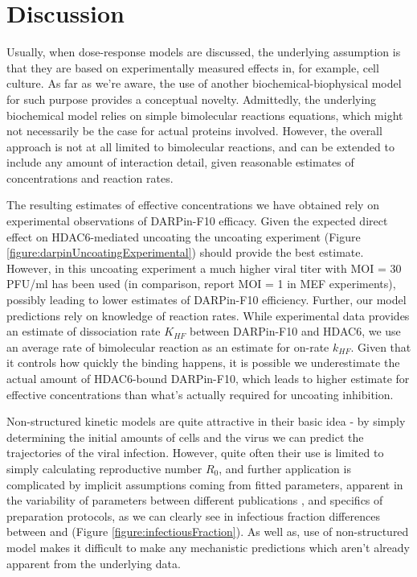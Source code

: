 \section{Discussion}

Usually, when dose-response models are discussed, the underlying assumption is that they are based on experimentally measured effects in, for example, cell culture. As far as we're aware, the use of another biochemical-biophysical model for such purpose provides a conceptual novelty. Admittedly, the underlying biochemical model relies on simple bimolecular reactions equations, which might not necessarily be the case for actual proteins involved. However, the overall approach is not at all limited to bimolecular reactions, and can be extended to include any amount of interaction detail, given reasonable estimates of concentrations and reaction rates.

The resulting estimates of effective concentrations we have obtained rely on experimental observations of DARPin-F10 efficacy. Given the expected direct effect on HDAC6-mediated uncoating the uncoating experiment (Figure \ref{figure:darpinUncoatingExperimental}) should provide the best estimate. However, in this uncoating experiment a much higher viral titer with MOI = 30 PFU/ml has been used (in comparison, \cite{banerjee2014influenza} report MOI = 1 in MEF experiments), possibly leading to lower estimates of DARPin-F10 efficiency. Further, our model predictions rely on knowledge of reaction rates. While experimental data provides an estimate of dissociation rate $K_{HF}$ between DARPin-F10 and HDAC6, we use an average rate of bimolecular reaction \cite{bionumbersbimolrate} as an estimate for on-rate $k_{HF}$. Given that it controls how quickly the binding happens, it is possible we underestimate the actual amount of HDAC6-bound DARPin-F10, which leads to higher estimate for effective concentrations than what's actually required for uncoating inhibition.

Non-structured kinetic models are quite attractive in their basic idea - by simply determining the initial amounts of cells and the virus we can predict the trajectories of the viral infection. However, quite often their use is limited to simply calculating reproductive number $R_0$, and further application is complicated by implicit assumptions coming from fitted parameters, apparent in the variability of parameters between different publications \cite{smith2011influenza}, and specifics of preparation protocols, as we can clearly see in infectious fraction differences between \cite{rudiger2019multiscale} and \cite{schulze2009infection} (Figure \ref{figure:infectiousFraction}). As well as, use of non-structured model makes it difficult to make any mechanistic predictions which aren't already apparent from the underlying data.


